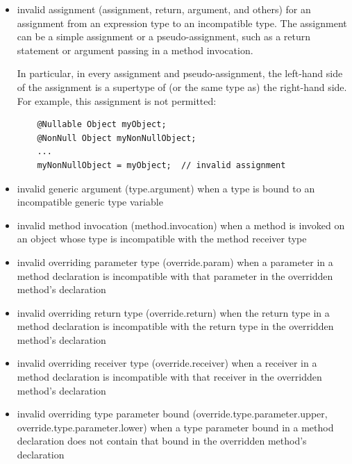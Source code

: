 \begin{itemize}

\item invalid assignment (assignment, return, argument, and others) for an
  assignment from an expression type to an incompatible type.  The
  assignment can be a simple assignment or a pseudo-assignment, such as a
  return statement or argument passing in a method invocation.

  In particular, in every assignment and pseudo-assignment, the
  left-hand side of the assignment is a supertype of (or the same type
  as) the right-hand side.  For example, this assignment is not
  permitted:

  \begin{Verbatim}
    @Nullable Object myObject;
    @NonNull Object myNonNullObject;
    ...
    myNonNullObject = myObject;  // invalid assignment
  \end{Verbatim}

\item invalid generic argument (type.argument) when a type
  is bound to an incompatible generic type variable

\item invalid method invocation (method.invocation) when a
  method is invoked on an object whose type is incompatible with the
  method receiver type

\item invalid overriding parameter type (override.param)
  when a parameter in a method declaration is incompatible with that
  parameter in the overridden method's declaration

\item invalid overriding return type (override.return) when the
  return type in a method declaration is incompatible with the
  return type in the overridden method's declaration

\item invalid overriding receiver type (override.receiver)
  when a receiver in a method declaration is incompatible with that
  receiver in the overridden method's declaration

\item invalid overriding type parameter bound
  (override.type.parameter.upper, override.type.parameter.lower)
  when a type parameter bound in a method declaration does not contain that
  bound in the overridden method's declaration

\end{itemize}


